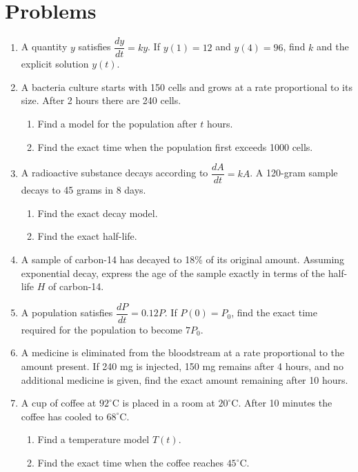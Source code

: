 \documentclass[12pt]{article}
\begin{document}
\section*{Problems}
\begin{enumerate}[leftmargin=*, itemsep=1em, topsep=0.8em]
  \item A quantity $y$ satisfies $\dfrac{dy}{dt}=ky$. If $y(1)=12$ and $y(4)=96$, find $k$ and the explicit solution $y(t)$.

  \item A bacteria culture starts with 150 cells and grows at a rate proportional to its size. After 2 hours there are 240 cells.
  \begin{enumerate}[label=\alph*)]
    \item Find a model for the population after $t$ hours.
    \item Find the exact time when the population first exceeds 1000 cells.
  \end{enumerate}

  \item A radioactive substance decays according to $\dfrac{dA}{dt}=kA$. A 120-gram sample decays to 45 grams in 8 days.
  \begin{enumerate}[label=\alph*)]
    \item Find the exact decay model.
    \item Find the exact half-life.
  \end{enumerate}

  \item A sample of carbon-14 has decayed to 18\% of its original amount. Assuming exponential decay, express the age of the sample exactly in terms of the half-life $H$ of carbon-14.

  \item A population satisfies $\dfrac{dP}{dt}=0.12P$. If $P(0)=P_0$, find the exact time required for the population to become $7P_0$.

  \item A medicine is eliminated from the bloodstream at a rate proportional to the amount present. If 240 mg is injected, 150 mg remains after 4 hours, and no additional medicine is given, find the exact amount remaining after 10 hours.

  \item A cup of coffee at $92^\circ$C is placed in a room at $20^\circ$C. After 10 minutes the coffee has cooled to $68^\circ$C.
  \begin{enumerate}[label=\alph*)]
    \item Find a temperature model $T(t)$.
    \item Find the exact time when the coffee reaches $45^\circ$C.
  \end{enumerate}


\end{enumerate}
\end{document}
